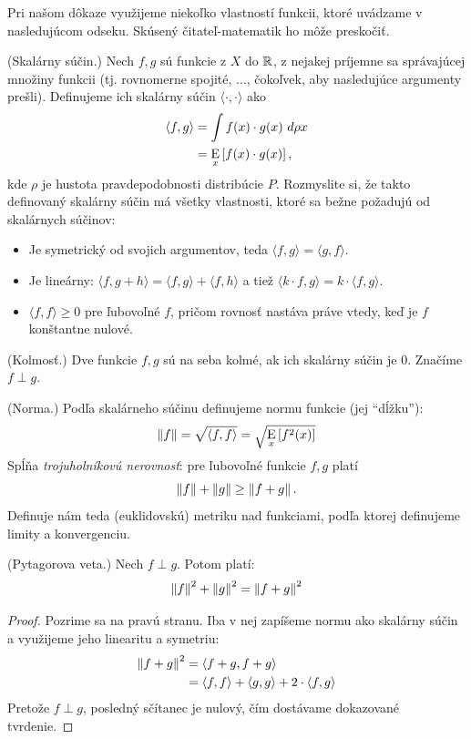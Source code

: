 Pri našom dôkaze využijeme niekoľko vlastností funkcii, ktoré uvádzame
v nasledujúcom odseku. Skúsený čitateľ-matematik ho môže preskočiť.

\begin{definition}
  (Skalárny súčin.) Nech $f, g$ sú funkcie z $X$ do $\mathbb{R}$,
  z nejakej príjemne sa správajúcej množiny funkcii (tj. rovnomerne
  spojité, ..., čokoľvek, aby nasledujúce argumenty prešli). Definujeme
  ich skalárny súčin $\langle \cdot, \cdot \rangle$ ako
  \begin{align}
    \langle f, g \rangle
      &= \int f(x) \cdot g(x)\ d\rho x \\
      &= \operatorname*{\mathrm{E}}_x \left[ f(x) \cdot g(x) \right],
  \end{align}
  kde $\rho$ je hustota pravdepodobnosti distribúcie $P$.
  Rozmyslite si, že takto definovaný skalárny súčin má všetky vlastnosti,
  ktoré sa bežne požadujú od skalárnych súčinov:
  \begin{itemize}
    \item Je symetrický od svojich argumentov, teda $\langle f, g \rangle = \langle g, f \rangle$.
    \item Je lineárny: $\langle f, g + h \rangle = \langle f, g \rangle + \langle f, h \rangle$
      a tiež $\langle k \cdot f, g \rangle = k \cdot \langle f, g \rangle$.
    \item $\langle f, f \rangle \geq 0$ pre ľubovoľné $f$, pričom rovnosť
      nastáva práve vtedy, keď je $f$ konštantne nulové.
  \end{itemize}
\end{definition}

\begin{definition}
  (Kolmosť.) Dve funkcie $f, g$ sú na seba kolmé, ak ich skalárny
  súčin je $0$. Značíme $f \perp g$.
\end{definition}

\begin{definition}
  (Norma.) Podľa skalárneho súčinu definujeme normu funkcie (jej ``dĺžku''):
  $$\left\lVert f\right\rVert = \sqrt{\langle f, f \rangle} = \sqrt{\operatorname*{\mathrm{E}}_x \left[ f^2(x) \right] }$$
  Spĺňa \emph{trojuholníkovú nerovnosť}: pre ľubovoľné funkcie $f, g$
  platí
  $$\left\lVert f\right\rVert + \left\lVert g\right\rVert \geq \left\lVert f + g\right\rVert.$$
  Definuje nám teda (euklidovskú) metriku nad funkciami, podľa
  ktorej definujeme limity a konvergenciu.
\end{definition}

\begin{lemma}
  (Pytagorova veta.) Nech $f \perp g$. Potom platí:
  $$\left\lVert f\right\rVert^2 + \left\lVert g\right\rVert^2 = \left\lVert f + g\right\rVert^2$$
\end{lemma}
\begin{proof}
  Pozrime sa na pravú stranu. Iba v nej zapíšeme normu ako skalárny
  súčin a využijeme jeho linearitu a symetriu:
  \begin{align}
    \left\lVert f + g\right\rVert^2
      &= \langle f + g, f + g \rangle \\
      &= \langle f, f \rangle + \langle g, g \rangle + 2 \cdot \langle f, g \rangle
  \end{align}
  Pretože $f \perp g$, posledný sčítanec je nulový, čím dostávame
  dokazované tvrdenie.
\end{proof}

